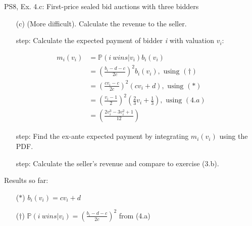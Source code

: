 \begin{frame}{PS8, Ex. 4.c: First-price sealed bid auctions with three bidders}
    \begin{itemize}
      \item[(c)] (More difficult). Calculate the revenue to the seller.
    \end{itemize}
    \vspace{-8pt}
    \begin{multicols}{2}
      \begin{itemize}
        \item[\nth{1} step:] Calculate the expected payment of bidder \textit{i} with valuation $v_i$:
      \end{itemize}
      \vspace{-14pt}
      \begin{align*}
        m_i(v_i)&=\mathbb{P}(i\ wins|v_i)b_i(v_i)\\
                &=\left(\frac{b_i-d-c}{2c}\right)^2b_i(v_i),\text{ using }(\dagger)\\
                &=\left(\frac{cv_i-c}{2c}\right)^2(cv_i+d),\text{ using }(*)\\
                &=\left(\frac{v_i-1}{2}\right)^2\left(\frac{2}{3}v_i+\frac{1}{3}\right),\text{ using }(4.a)\\
                &=\left(\frac{2v_i^3-3v_i^2+1}{12}\right)
      \end{align*}
      \vspace{-14pt}
      \begin{itemize}
        \item[\nth{2} step:] Find the ex-ante expected payment by integrating $m_i(v_i)$ using the PDF.
      \end{itemize}
      \vspace{-4pt}
      \vspace{-4pt}
      \begin{itemize}
        \item[\nth{3} step:] Calculate the seller's revenue and compare to exercise (3.b).
      \end{itemize}
      \vfill\null\columnbreak
      Results so far:
      \vspace{-6pt}
      \begin{itemize}
        \item[($*$)] $b_i(v_i) = cv_i+d$
        \item[($\dagger$)] $\mathbb{P}(i\ wins|v_i)=\left(\frac{b_i-d-c}{2c}\right)^2$ from (4.a)

\end{itemize}
\end{multicols}
\end{frame}
